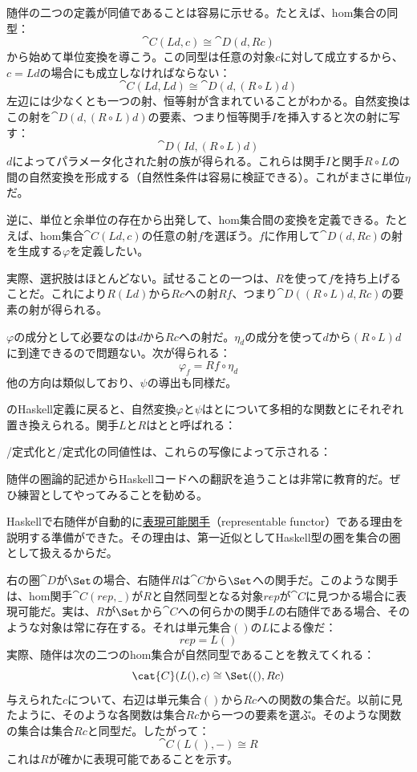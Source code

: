 随伴の二つの定義が同値であることは容易に示せる。たとえば、hom集合の同型：
\[\cat{C}(L d, c) \cong \cat{D}(d, R c)\]
から始めて単位変換を導こう。この同型は任意の対象$c$に対して成立するから、$c = L d$の場合にも成立しなければならない：
\[\cat{C}(L d, L d) \cong \cat{D}(d, (R \circ L) d)\]
左辺には少なくとも一つの射、恒等射が含まれていることがわかる。自然変換はこの射を$\cat{D}(d, (R \circ L) d)$の要素、つまり恒等関手$I$を挿入すると次の射に写す：
\[\cat{D}(I d, (R \circ L) d)\]
$d$によってパラメータ化された射の族が得られる。これらは関手$I$と関手$R \circ L$の間の自然変換を形成する（自然性条件は容易に検証できる）。これがまさに単位$\eta$だ。

逆に、単位と余単位の存在から出発して、hom集合間の変換を定義できる。たとえば、hom集合$\cat{C}(L d, c)$の任意の射$f$を選ぼう。$f$に作用して$\cat{D}(d, R c)$の射を生成する$\varphi$を定義したい。

実際、選択肢はほとんどない。試せることの一つは、$R$を使って$f$を持ち上げることだ。これにより$R (L d)$から$R c$への射$R f$、つまり$\cat{D}((R \circ L) d, R c)$の要素の射が得られる。

$\varphi$の成分として必要なのは$d$から$R c$への射だ。$\eta_d$の成分を使って$d$から$(R \circ L) d$に到達できるので問題ない。次が得られる：
\[\varphi_f = R f \circ \eta_d\]
他の方向は類似しており、$\psi$の導出も同様だ。

のHaskell定義に戻ると、自然変換$\varphi$と$\psi$はとについて多相的な関数とにそれぞれ置き換えられる。関手$L$と$R$はとと呼ばれる：

/定式化と/\allowbreak{}定式化の同値性は、これらの写像によって示される：

随伴の圏論的記述からHaskellコードへの翻訳を追うことは非常に教育的だ。ぜひ練習としてやってみることを勧める。

Haskellで右随伴が自動的に\hyperref[representable-functors]{表現可能関手}（representable functor）である理由を説明する準備ができた。その理由は、第一近似としてHaskell型の圏を集合の圏として扱えるからだ。

右の圏$\cat{D}$が$\Set$の場合、右随伴$R$は$\cat{C}$から$\Set$への関手だ。このような関手は、hom関手$\cat{C}(\mathit{rep}, \_)$が$R$と自然同型となる対象$\mathit{rep}$が$\cat{C}$に見つかる場合に表現可能だ。実は、$R$が$\Set$から$\cat{C}$への何らかの関手$L$の右随伴である場合、そのような対象は常に存在する。それは単元集合$()$の$L$による像だ：
\[\mathit{rep} = L ()\]
実際、随伴は次の二つのhom集合が自然同型であることを教えてくれる：
\[\cat{C}(L (), c) \cong \Set((), R c)\]
与えられた$c$について、右辺は単元集合$()$から$R c$への関数の集合だ。以前に見たように、そのような各関数は集合$R c$から一つの要素を選ぶ。そのような関数の集合は集合$R c$と同型だ。したがって：
\[\cat{C}(L (), -) \cong R\]
これは$R$が確かに表現可能であることを示す。

